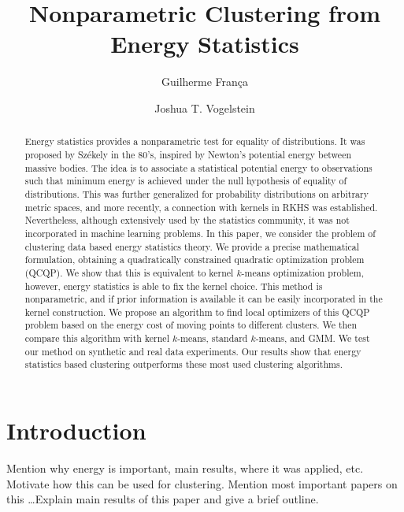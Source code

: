 \documentclass[aps,preprint,nofootinbib,floatfix]{revtex4-1}
\begin{document}
\title{Nonparametric Clustering from  Energy Statistics}

\author{Guilherme Fran\c ca}

\author{Joshua T. Vogelstein}



\begin{abstract}
Energy statistics provides a nonparametric test for equality of distributions.
It was proposed by 
Sz\' ekely in the 80's,
inspired by Newton's potential energy between massive bodies. The idea
is to associate a statistical potential energy to observations such that 
minimum energy is achieved under the null hypothesis of equality of 
distributions. This 
was further generalized for probability 
distributions on arbitrary metric spaces,
and more recently, a connection with kernels in RKHS was established.
Nevertheless, although extensively used by the statistics community, it was
not incorporated in machine learning problems.
In this paper, we consider the problem of clustering data based
energy statistics theory. 
We provide a precise mathematical formulation, obtaining
a quadratically constrained quadratic optimization problem (QCQP). 
We show that
this is equivalent to kernel $k$-means
optimization problem, however,
energy statistics is able to fix the kernel choice. 
This method is nonparametric, and if prior information is available
it can be easily incorporated in the kernel construction.
We propose an algorithm
to find local optimizers of this QCQP problem based on the energy cost
of moving points to different clusters. We then compare this algorithm with
kernel $k$-means, standard $k$-means, and GMM. We test our method
on synthetic and real data experiments.
Our results show that energy statistics based clustering outperforms
these most used clustering algorithms.
\end{abstract}

\maketitle

\section{Introduction}

Mention why energy is important, main results, where it was applied, etc.
Motivate how this can be used for clustering. Mention most important
papers on this \ldots Explain main results of this paper and give a brief
outline.
\end{document}
